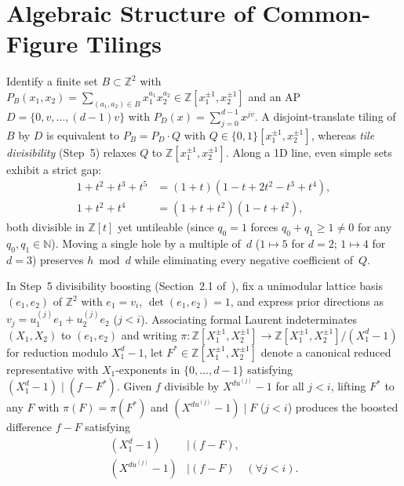\documentclass[11pt,twocolumn]{article}
\newcommand{\ZZ}{\mathbb{Z}}
\newcommand{\NN}{\mathbb{N}}
\begin{document}
\section{Algebraic Structure of Common-Figure Tilings}\label{sec:prelim}
Identify a finite set $B \subset \ZZ^2$ with $P_B(x_1, x_2) = \sum_{(a_1,a_2)\in B} x_1^{a_1} x_2^{a_2} \in \ZZ[x_1^{\pm 1}, x_2^{\pm 1}]$ and an AP $D = \{0, v, \dots, (d-1)v\}$ with $P_D(x) = \sum_{j=0}^{d-1} x^{jv}$. A disjoint-translate tiling of $B$ by $D$ is equivalent to $P_B = P_D \cdot Q$ with $Q \in \{0,1\}[x_1^{\pm 1}, x_2^{\pm 1}]$, whereas \emph{tile divisibility} (Step~5) relaxes $Q$ to $\ZZ[x_1^{\pm 1}, x_2^{\pm 1}]$. Along a 1D line, even simple sets exhibit a strict gap:
\begin{equation}
\begin{aligned}
  1 + t^2 + t^3 + t^5 &= (1 + t)(1 - t + 2t^2 - t^3 + t^4), \\
  1 + t^2 + t^4 &= (1 + t + t^2)(1 - t + t^2),
\end{aligned}
  \label{eq:gap}
\end{equation}
both divisible in $\ZZ[t]$ yet untileable (since $q_0 = 1$ forces $q_0 + q_1 \ge 1 \neq 0$ for any $q_0, q_1 \in \NN$). Moving a single hole by a multiple of~$d$ ($1 \mapsto 5$ for $d=2$; $1 \mapsto 4$ for $d=3$) preserves $h \bmod d$ while eliminating every negative coefficient of~$Q$.

In Step~5 divisibility boosting (Section~2.1 of~\cite{keevash2026dominoes}), fix a unimodular lattice basis $(e_1, e_2)$ of $\ZZ^2$ with $e_1 = v_i$, $\det(e_1, e_2) = 1$, and express prior directions as $v_j = u_1^{(j)} e_1 + u_2^{(j)} e_2$ ($j < i$). Associating formal Laurent indeterminates $(X_1, X_2)$ to $(e_1, e_2)$ and writing $\pi \colon \ZZ[X_1^{\pm 1}, X_2^{\pm 1}] \to \ZZ[X_1^{\pm 1}, X_2^{\pm 1}]/(X_1^d - 1)$ for reduction modulo $X_1^d - 1$, let $F^* \in \ZZ[X_1^{\pm 1}, X_2^{\pm 1}]$ denote a canonical reduced representative with $X_1$-exponents in $\{0, \dots, d-1\}$ satisfying $(X_1^d - 1) \mid (f - F^*)$. Given $f$ divisible by $X^{d u^{(j)}} - 1$ for all $j < i$, lifting $F^*$ to any $F$ with $\pi(F) = \pi(F^*)$ and $(X^{d u^{(j)}} - 1) \mid F$ ($j < i$) produces the boosted difference $f - F$ satisfying
\begin{equation}
\begin{aligned}
  (X_1^d - 1) &\mid (f - F), \\
  (X^{d u^{(j)}} - 1) &\mid (f - F)\quad (\forall j < i).
\end{aligned}
  \label{eq:boost}
\end{equation}
\end{document}
